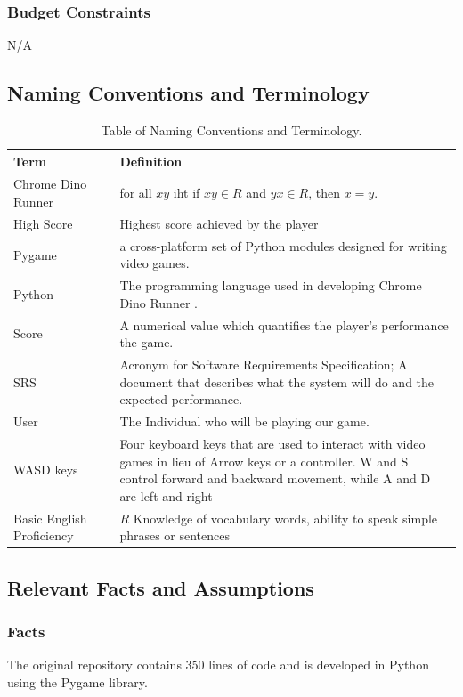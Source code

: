 \documentclass[12pt]{article}
\begin{document}
\subsubsection{Budget Constraints}
N/A
\subsection{Naming Conventions and Terminology}

\begin{table}[h!]
\caption{Table of Naming Conventions and Terminology.}
\begin{tabular}{l c p{}}
\toprule
Term       && Definition \\
\midrule
Chrome Dino Runner  && for all $xy$ iht if $xy \in R$ and $yx \in R$, then $x=y$. \\
\midrule
High Score          && Highest score achieved by the player \\
\midrule
Pygame              && a cross-platform set of Python modules designed for writing video games. \\
\midrule
Python              && The programming language used in developing Chrome Dino Runner . \\
\midrule
Score               && A numerical value which quantifies the player's performance the game. \\
\midrule
SRS       && Acronym for Software Requirements Specification; A document that describes what the system will do and the expected performance. \\
\midrule
User       && The Individual who will be playing  our game. \\
\midrule
WASD keys           && Four keyboard keys that are used to interact with video games in lieu of Arrow keys or a controller. W and S control forward and backward movement, while A and D are left and right \\
\midrule
Basic English Proficiency && $R$ Knowledge of vocabulary words, ability to speak simple phrases or sentences \\
\bottomrule
\end{tabular}
\end{table}

\subsection{Relevant Facts and Assumptions}
\subsubsection{Facts}
The original repository contains 350 lines of code and is developed in Python using the Pygame library. 
\end{document}
